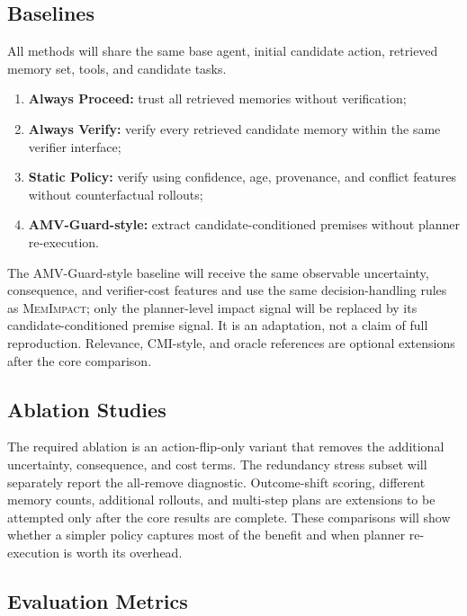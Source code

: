 \documentclass[11pt]{article}
\newcommand{\method}{\textsc{MemImpact}}
\begin{document}
\subsection{Baselines}

All methods will share the same base agent, initial candidate action, retrieved memory set, tools, and candidate tasks.
\begin{enumerate}
  \item \textbf{Always Proceed:} trust all retrieved memories without verification;
  \item \textbf{Always Verify:} verify every retrieved candidate memory within the same verifier interface;
  \item \textbf{Static Policy:} verify using confidence, age, provenance, and conflict features without counterfactual rollouts;
  \item \textbf{AMV-Guard-style:} extract candidate-conditioned premises without planner re-execution.
\end{enumerate}
The AMV-Guard-style baseline will receive the same observable uncertainty, consequence, and verifier-cost features and use the same decision-handling rules as \method; only the planner-level impact signal will be replaced by its candidate-conditioned premise signal. It is an adaptation, not a claim of full reproduction. Relevance, CMI-style, and oracle references are optional extensions after the core comparison.

\subsection{Ablation Studies}

The required ablation is an action-flip-only variant that removes the additional uncertainty, consequence, and cost terms. The redundancy stress subset will separately report the all-remove diagnostic. Outcome-shift scoring, different memory counts, additional rollouts, and multi-step plans are extensions to be attempted only after the core results are complete. These comparisons will show whether a simpler policy captures most of the benefit and when planner re-execution is worth its overhead.

\subsection{Evaluation Metrics}
\end{document}
